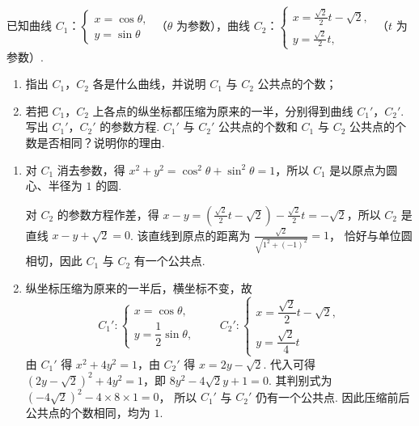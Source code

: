 \begin{problem}
已知曲线 \(C_{1}\)：\(\begin{cases}
x = \cos \theta ,\\
y = \sin \theta
\end{cases}\) （\(\theta\) 为参数），曲线 \(C_2\)：\(\begin{cases}
x = \frac{\sqrt{2}}{2} t - \sqrt{2},\\
y = \frac{\sqrt{2}}{2} t,
\end{cases}\) （\(t\) 为参数）.

\begin{enumerate}
\item 指出 \(C_1\)，\(C_2\) 各是什么曲线，并说明 \(C_1\) 与 \(C_2\) 公共点的个数；
\item 若把 \(C_1\)，\(C_2\) 上各点的纵坐标都压缩为原来的一半，分别得到曲线 \(C_1'\)，\(C_2'\). 写出 \(C_1'\)，\(C_2'\) 的参数方程. \(C_1'\) 与 \(C_2'\) 公共点的个数和 \(C_1\) 与 \(C_2\) 公共点的个数是否相同？说明你的理由.
\end{enumerate}

\begin{solution}
\begin{enumerate}
\item 对 \(C_1\) 消去参数，得 \(x^{2}+y^{2}=\cos^{2}\theta+\sin^{2}\theta=1\)，所以 \(C_1\) 是以原点为圆心、半径为 \(1\) 的圆.

对 \(C_2\) 的参数方程作差，得
\(x-y=\left(\frac{\sqrt{2}}{2}t-\sqrt{2}\right)-\frac{\sqrt{2}}{2}t=-\sqrt{2}\)，所以 \(C_2\) 是直线 \(x-y+\sqrt{2}=0\). 该直线到原点的距离为 \(\frac{\sqrt{2}}{\sqrt{1^{2}+(-1)^{2}}}=1\)，
恰好与单位圆相切，因此 \(C_1\) 与 \(C_2\) 有一个公共点.

\item 纵坐标压缩为原来的一半后，横坐标不变，故
\[
C_1':\begin{cases}
x=\cos\theta,\\
y=\dfrac12\sin\theta,
\end{cases}
\qquad
C_2':\begin{cases}
x=\dfrac{\sqrt{2}}{2}t-\sqrt{2},\\
y=\dfrac{\sqrt{2}}{4}t
\end{cases}
\]
由 \(C_1'\) 得 \(x^{2}+4y^{2}=1\)，由 \(C_2'\) 得 \(x=2y-\sqrt{2}\). 代入可得
\((2y-\sqrt{2})^{2}+4y^{2}=1\)，即 \(8y^{2}-4\sqrt{2}y+1=0\). 其判别式为 \(\left(-4\sqrt{2}\right)^{2}-4\times8\times1=0\)，
所以 \(C_1'\) 与 \(C_2'\) 仍有一个公共点. 因此压缩前后公共点的个数相同，均为 \(1\).
\end{enumerate}
\end{solution}
\end{problem}
